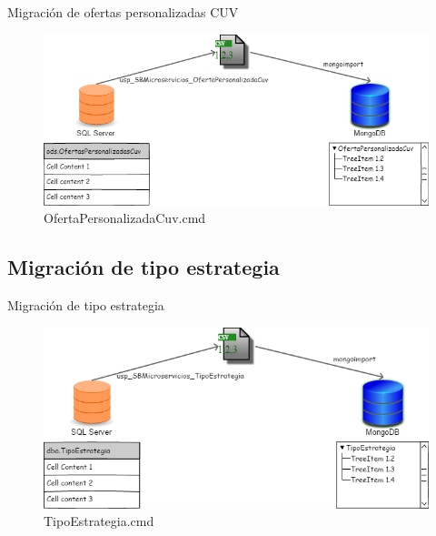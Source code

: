 \documentclass{bredelebeamer}
\begin{document}
\begin{frame}{Migración de ofertas personalizadas CUV}
\begin{figure}
\centering
\includegraphics[scale=0.35]{imgs/OfertaPersonalizadaCuv.png}
\caption{OfertaPersonalizadaCuv.cmd}
\end{figure}
\end{frame}

\subsection{Migración de tipo estrategia}
\begin{frame}{Migración de tipo estrategia}
\begin{figure}
\centering
\includegraphics[scale=0.35]{imgs/TipoEstrategia.png}
\caption{TipoEstrategia.cmd}
\end{figure}
\end{frame}
\end{document}
